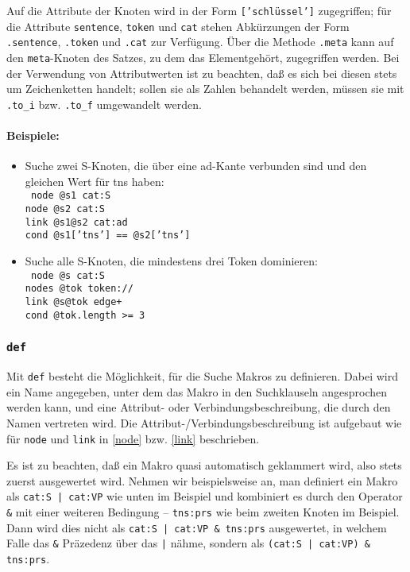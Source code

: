 \documentclass[12pt]{scrartcl}
\begin{document}
Auf die Attribute der Knoten wird in der Form \texttt{['schlüssel']} zugegriffen; für die Attribute \texttt{sentence}, \texttt{token} und \texttt{cat} stehen Abkürzungen der Form \texttt{.sentence}, \texttt{.token} und \texttt{.cat} zur Verfügung. Über die Methode \texttt{.meta} kann auf den \texttt{meta}-Knoten des Satzes, zu dem das Elementgehört, zugegriffen werden. Bei der Verwendung von Attributwerten ist zu beachten, daß es sich bei diesen stets um Zeichenketten handelt; sollen sie als Zahlen behandelt werden, müssen sie mit \texttt{.to\_i} bzw. \texttt{.to\_f} umgewandelt werden.


\paragraph*{Beispiele:}
\begin{itemize}
	\item Suche zwei S-Knoten, die über eine ad-Kante verbunden sind und den gleichen Wert für tns haben:\\
	{\tt
	node @s1 cat:S\\[-.4ex]
	node @s2 cat:S\\[-.4ex]
	link @s1@s2 cat:ad\\[-.4ex]
	cond @s1['tns'] == @s2['tns']
	}
	\item Suche alle S-Knoten, die mindestens drei Token dominieren:\\
	{\tt
	node @s cat:S\\[-.4ex]
	nodes @tok token://\\[-.4ex]
	link @s@tok edge+\\[-.4ex]
	cond @tok.length >= 3
	}
\end{itemize}


\subsubsection{\texttt{def}}\label{def}

Mit \texttt{def} besteht die Möglichkeit, für die Suche Makros zu definieren. Dabei wird ein Name angegeben, unter dem das Makro in den Suchklauseln angesprochen werden kann, und eine Attribut- oder Verbindungsbeschreibung, die durch den Namen vertreten wird. Die Attribut-/Verbindungsbeschreibung ist aufgebaut wie für \texttt{node} und \texttt{link} in \ref{node} bzw. \ref{link} beschrieben.

Es ist zu beachten, daß ein Makro quasi automatisch geklammert wird, also stets zuerst ausgewertet wird. Nehmen wir beispielsweise an, man definiert ein Makro als \texttt{cat:S | cat:VP} wie unten im Beispiel und kombiniert es durch den Operator \texttt{\&} mit einer weiteren Bedingung – \texttt{tns:prs} wie beim zweiten Knoten im Beispiel. Dann wird dies nicht als \texttt{cat:S | cat:VP \& tns:prs} ausgewertet, in welchem Falle das \texttt{\&} Präzedenz über das \texttt{|} nähme, sondern als \texttt{(cat:S | cat:VP) \& tns:prs}.
\end{document}
